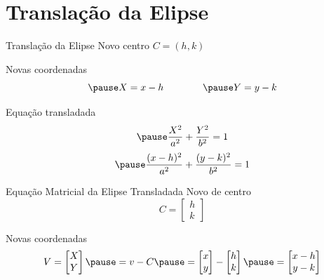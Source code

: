 \documentclass[fleqn,aspectratio=169,12pt]{beamer}
\begin{document}



\section{Translação da Elipse}

\begin{frame}{Translação da Elipse}
  Novo centro \(C = (h, k)\)

  \pause
  Novas coordenadas
  \[
    \pause
    X = x - h
    \qquad\qquad
    \pause
    Y = y - k
  \]

  \pause
  Equação transladada
  \[
    \pause
    \frac{X^2}{a^2} + \frac{Y^2}{b^2} = 1
  \]
  \[
    \pause
    \frac{(x-h)^2}{a^2} + \frac{(y-k)^2}{b^2} = 1
  \]
\end{frame}

\begin{proofframe}{Equação Matricial da Elipse Transladada}
  Novo de centro
  \[
    C
    = \begin{bmatrix}
      h \\
      k
    \end{bmatrix}
  \]

  \pause
  \bigskip
  Novas coordenadas
  \[
    V
    = \begin{bmatrix}
      X \\
      Y
    \end{bmatrix}
    \pause
    = v - C
    \pause
    = \begin{bmatrix}
      x \\
      y
    \end{bmatrix}
    -
    \begin{bmatrix}
      h \\
      k
    \end{bmatrix}
    \pause
    = \begin{bmatrix}
      x - h \\
      y - k
    \end{bmatrix}
  \]
\end{proofframe}
\end{document}
